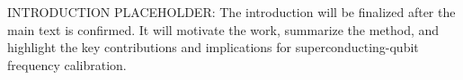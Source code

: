 

INTRODUCTION PLACEHOLDER: The introduction will be finalized after the main text is confirmed.  It will motivate the work, summarize the method, and highlight the key contributions and implications for superconducting-qubit frequency calibration.

\newpage
